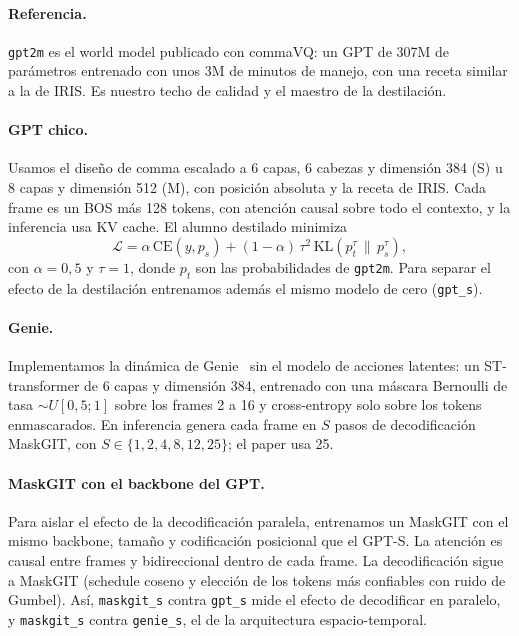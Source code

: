 \documentclass[10pt,twocolumn,a4paper]{article}
\DeclareRobustCommand{\editado}[1]{\textcolor{editado}{#1}}
\DeclareRobustCommand{\editado}[1]{#1}
\begin{document}
\paragraph{Referencia.} \texttt{gpt2m} es el world model publicado con commaVQ: un GPT de 307M de parámetros entrenado con unos 3M de minutos de manejo, con \editado{una receta similar a la de IRIS}. Es nuestro techo de calidad y el maestro de la destilación.

\paragraph{GPT chico.} Usamos el diseño de comma escalado a 6 capas, 6 cabezas y dimensión 384 (S) u 8 capas y dimensión 512 (M), con posición absoluta y la receta de IRIS. Cada frame es un BOS más 128 tokens, con atención causal sobre todo el contexto, y la inferencia usa KV cache. El alumno destilado minimiza
\[
\mathcal{L} = \alpha\,\mathrm{CE}(y, p_s) + (1-\alpha)\,\tau^2\,\mathrm{KL}\!\left(p_t^{\tau}\,\|\,p_s^{\tau}\right),
\]
con $\alpha=0{,}5$ y $\tau=1$, donde $p_t$ son las probabilidades de \texttt{gpt2m}. Para separar el efecto de la destilación entrenamos además el mismo modelo de cero (\texttt{gpt\_s}).

\paragraph{Genie.} Implementamos la dinámica de Genie~\cite{bruce2024genie} sin el modelo de acciones latentes: un ST-transformer de 6 capas y dimensión 384, entrenado con una máscara Bernoulli de tasa $\sim U[0{,}5;1]$ sobre los frames 2 a 16 y cross-entropy solo sobre los tokens enmascarados. En inferencia genera cada frame en $S$ pasos de decodificación MaskGIT, con $S\in\{1,2,4,8,12,25\}$; el paper usa 25.

\paragraph{MaskGIT con el backbone del GPT.} Para aislar el efecto de la decodificación paralela, entrenamos un MaskGIT con el mismo backbone, tamaño y codificación posicional que el GPT-S. La atención es causal entre frames y bidireccional dentro de cada frame. La decodificación sigue a MaskGIT (schedule coseno y elección de los tokens más confiables con ruido de Gumbel). Así, \texttt{maskgit\_s} contra \texttt{gpt\_s} mide el efecto de decodificar en paralelo, y \texttt{maskgit\_s} contra \texttt{genie\_s}, el de la arquitectura espacio-temporal.
\end{document}
